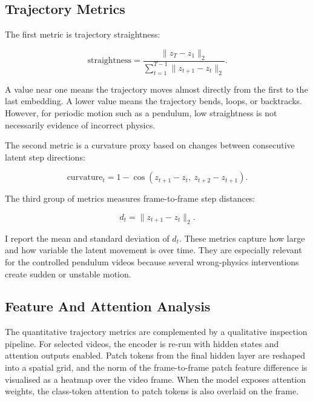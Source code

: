\documentclass[final-report]{report-template}
\begin{document}
\subsection{Trajectory Metrics}
The first metric is trajectory straightness:

\begin{equation}
    \mathrm{straightness}
    =
    \frac{\lVert z_T - z_1 \rVert_2}
    {\sum_{t=1}^{T-1} \lVert z_{t+1} - z_t \rVert_2}.
\end{equation}

A value near one means the trajectory moves almost directly from the first to
the last embedding. A lower value means the trajectory bends, loops, or
backtracks. However, for periodic motion such as a pendulum, low straightness is
not necessarily evidence of incorrect physics.

The second metric is a curvature proxy based on changes between consecutive
latent step directions:

\begin{equation}
    \mathrm{curvature}_t
    =
    1 -
    \cos \left(z_{t+1} - z_t,\ z_{t+2} - z_{t+1}\right).
\end{equation}

The third group of metrics measures frame-to-frame step distances:

\begin{equation}
    d_t = \lVert z_{t+1} - z_t \rVert_2.
\end{equation}

I report the mean and standard deviation of $d_t$. These metrics capture how
large and how variable the latent movement is over time. They are especially
relevant for the controlled pendulum videos because several wrong-physics
interventions create sudden or unstable motion.

\subsection{Feature And Attention Analysis}
The quantitative trajectory metrics are complemented by a qualitative
inspection pipeline. For selected videos, the encoder is re-run with hidden
states and attention outputs enabled. Patch tokens from the final hidden layer
are reshaped into a spatial grid, and the norm of the frame-to-frame patch
feature difference is visualised as a heatmap over the video frame. When the
model exposes attention weights, the class-token attention to patch tokens is
also overlaid on the frame.
\end{document}
